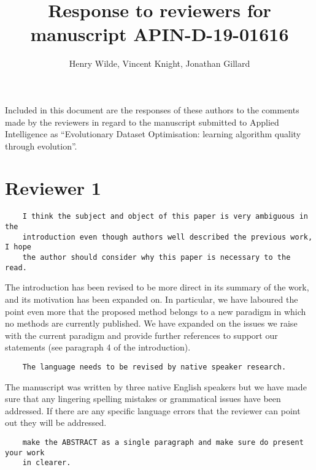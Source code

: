 \documentclass[11pt]{article}
\title{Response to reviewers for manuscript APIN-D-19-01616}
\author{Henry Wilde, Vincent Knight, Jonathan Gillard}
\date{}
\begin{document}
\maketitle%

Included in this document are the responses of these authors to the comments
made by the reviewers in regard to the manuscript submitted to Applied
Intelligence as ``Evolutionary Dataset Optimisation: learning algorithm quality
through evolution''.

\section*{Reviewer 1}

\begin{tcolorbox}
\begin{verbatim}
    I think the subject and object of this paper is very ambiguous in the
    introduction even though authors well described the previous work, I hope
    the author should consider why this paper is necessary to the read.
\end{verbatim}
\end{tcolorbox}

The introduction has been revised to be more direct in its summary of the work,
and its motivation has been expanded on. In particular, we have laboured the
point even more that the proposed method belongs to a new paradigm in which no
methods are currently published. We have expanded on the issues we raise with
the current paradigm and provide further references to support our statements
(see paragraph 4 of the introduction).\\

\begin{tcolorbox}
\begin{verbatim}
    The language needs to be revised by native speaker research.
\end{verbatim}
\end{tcolorbox}

The manuscript was written by three native English speakers but we have made
sure that any lingering spelling mistakes or grammatical issues have been
addressed. If there are any specific language errors that the reviewer can point
out they will be addressed.\\

\begin{tcolorbox}
\begin{verbatim}
    make the ABSTRACT as a single paragraph and make sure do present your work
    in clearer.
\end{verbatim}
\end{tcolorbox}
\end{document}
